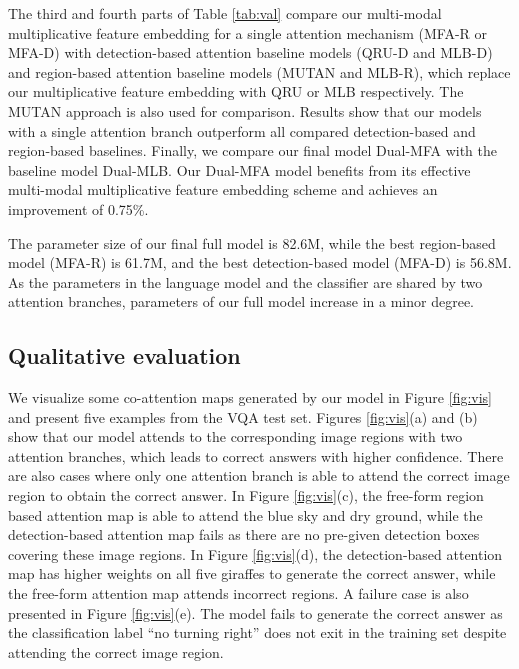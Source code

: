 \documentclass[letterpaper]{article}
\begin{document}
{The third and fourth parts of Table \ref{tab:val} compare our multi-modal multiplicative feature embedding for a single attention mechanism (MFA-R or MFA-D) with detection-based attention baseline models (QRU-D and MLB-D) and region-based attention baseline models (MUTAN and MLB-R), which replace our multiplicative feature embedding with QRU \cite{li2016visual} or MLB \cite{kim2016hadamard} respectively. The MUTAN \cite{benyounescadene2017mutan} approach is also used for comparison. Results show that our models with a single attention branch outperform all compared detection-based and region-based baselines. Finally, we compare our final model Dual-MFA with the baseline model Dual-MLB. Our Dual-MFA model benefits from its effective multi-modal multiplicative feature embedding scheme and achieves an improvement of 0.75\%. 

The parameter size of our final full model is 82.6M, while the best region-based model (MFA-R) is 61.7M, and the best detection-based model (MFA-D) is 56.8M. As the parameters in the language model and the classifier are shared by two attention branches, parameters of our full model increase in a minor degree. 






\subsection{Qualitative evaluation}

We visualize some co-attention maps generated by our model in Figure \ref{fig:vis} and present five examples from the VQA test set. Figures \ref{fig:vis}(a) and (b) show that our model attends to the corresponding image regions with two attention branches, which leads to correct answers with higher confidence. There are also cases where only one attention branch is able to attend the correct image region to obtain the correct answer.
In Figure \ref{fig:vis}(c), the free-form region based attention map is able to attend the blue sky and dry ground, while the detection-based attention map fails as there are no pre-given detection boxes covering these image regions. In Figure \ref{fig:vis}(d), the detection-based attention map has higher weights on all five giraffes to generate the correct answer, while the free-form attention map attends incorrect regions. A failure case is also presented in Figure \ref{fig:vis}(e). The model fails to generate the correct answer as the classification label ``no turning right'' does not exit in the training set despite attending the correct image region.


}
\end{document}
